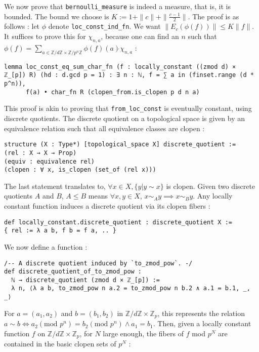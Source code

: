 \documentclass[a4paper,UKenglish,cleveref, autoref, thm-restate,pdfa]{lipics-v2021}
\newcommand{\lean}[1]{\texttt{#1}\xspace} %
\begin{document}
We now prove that \lean{bernoulli\_measure} is indeed a measure, that is, it is bounded. The bound we choose is 
$K := 1 + \parallel c \parallel + \parallel \frac{c - 1}{2} \parallel$. The proof is as follows : let $\phi$ denote \lean{loc\_const\_ind\_fn}. 
We want $ \parallel E_c (\phi (f)) \parallel \le K \parallel f \parallel $. It suffices to prove this for $\chi_{n, a}$, because one can find an $n$ such that 
$\phi (f) = \sum_{a \in \mathbb{Z}/d \mathbb{Z} \times \mathbb{Z} /p^n \mathbb{Z}} \phi(f) (a) \dot{} \chi_{n,a}$ :
\begin{lstlisting}
lemma loc_const_eq_sum_char_fn (f : locally_constant ((zmod d) × ℤ_[p]) R) (hd : d.gcd p = 1) : ∃ n : ℕ, f = ∑ a in (finset.range (d * p^n)), 
      f(a) • char_fn R (clopen_from.is_clopen p d n a)
\end{lstlisting}
This proof is akin to proving that \lean{from\_loc\_const} is eventually constant, using discrete quotients. 
The discrete quotient on a topological space is given by an equivalence relation such 
that all equivalence classes are clopen : 
\begin{lstlisting}
structure (X : Type*) [topological_space X] discrete_quotient :=
(rel : X → X → Prop) 
(equiv : equivalence rel) 
(clopen : ∀ x, is_clopen (set_of (rel x)))
\end{lstlisting}
The last statement translates to, $\forall x \in X, \{ y | y \sim x \}$ is clopen. 
Given two discrete quotients $A$ and $B$, $A \le B$ means $\forall x,y \in X$, 
$x \sim_{A} y \implies x \sim_{B} y$. Any locally constant function induces a 
discrete quotient via its clopen fibers : 
\begin{lstlisting}
def locally_constant.discrete_quotient : discrete_quotient X := 
{ rel := λ a b, f b = f a, .. }
\end{lstlisting}
We now define a function : 
\begin{lstlisting}
/-- A discrete quotient induced by `to_zmod_pow`. -/
def discrete_quotient_of_to_zmod_pow : 
  ℕ → discrete_quotient (zmod d × ℤ_[p]) := 
  λ n, ⟨λ a b, to_zmod_pow n a.2 = to_zmod_pow n b.2 ∧ a.1 = b.1, _, _⟩
\end{lstlisting}
For $a = (a_1, a_2)$ and $b = (b_1, b_2)$ in $\mathbb{Z}/d \mathbb{Z} \times \mathbb{Z}_p$, this represents the relation 
$ a \sim b \iff a_2 (\text{mod } p^n) = b_2 (\text{mod } p^n) \wedge a_1 = b_1 $. 
Then, given a locally constant function $f$ on $\mathbb{Z}/d \mathbb{Z} \times \mathbb{Z}_p$, for $N$ large enough, the fibers of $f$ mod $p^N$ are contained in the basic clopen sets of $p^N$ :
\end{document}
